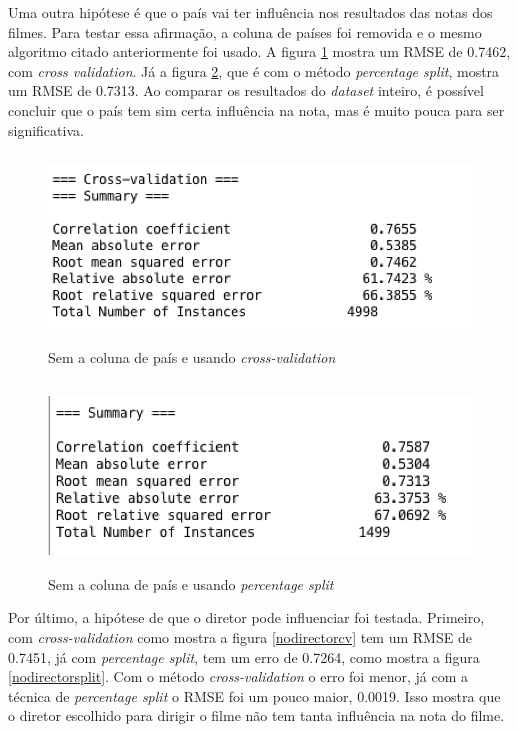 Uma outra hipótese é que o país vai ter influência nos resultados das notas dos filmes. Para testar essa afirmação, a coluna de países foi removida e o mesmo algoritmo citado anteriormente foi usado. A figura \ref{nocountrycv} mostra um RMSE de 0.7462, com \textit{cross validation}. Já a figura \ref{nocountrysplit}, que é com o método \textit{percentage split}, mostra um RMSE de 0.7313. Ao comparar os resultados do \textit{dataset} inteiro, é possível concluir que o país tem sim certa influência na nota, mas é muito pouca para ser significativa. 

\begin{figure}[H]
\centering
\includegraphics[height=5cm]{imagens/no_country_cv.png}
\caption{Sem a coluna de país e usando \textit{cross-validation}}
\label{nocountrycv}
\end{figure}

\begin{figure}[H]
\centering
\includegraphics[height=5cm]{imagens/no_country_split.png}
\caption{Sem a coluna de país e usando \textit{percentage split}}
\label{nocountrysplit}
\end{figure}


Por último, a hipótese de que o diretor pode influenciar foi testada. Primeiro, com \textit{cross-validation} como mostra a figura \ref{nodirectorcv} tem um RMSE de 0.7451, já com \textit{percentage split}, tem um erro de 0.7264, como mostra a figura \ref{nodirectorsplit}. Com o método \textit{cross-validation} o erro foi menor, já com a técnica de \textit{percentage split} o RMSE foi um pouco maior, 0.0019. Isso mostra que o diretor escolhido para dirigir o filme não tem tanta influência na nota do filme. 

